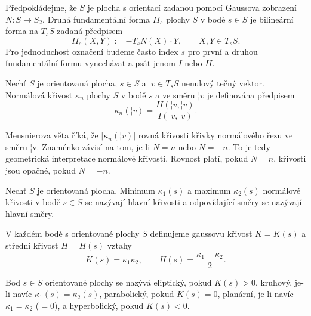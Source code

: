 \documentclass[12pt]{article}                   %
\begin{document}
        \begin{definice}
            Předpokládejme, že $S$ je plocha s orientací zadanou pomocí Gaussova zobrazení $N: S \rightarrow S_2$. Druhá fundamentální forma $II_s$ plochy $S$ v bodě $s \in S$ je bilineární forma na $T_sS$ zadaná předpisem
            $$ II_s(X, Y) := -T_sN(X)·Y, \qquad X, Y \in T_sS. $$
            Pro jednoduchost označení budeme často index $s$ pro první a druhou fundamentální formu vynechávat a psát jenom $I$ nebo $II$.
        \end{definice}

        \begin{definice}
            Nechť $S$ je orientovaná plocha, $s \in S$ a $¦v \in T_sS$ nenulový tečný vektor. Normálová křivost $\kappa_n$ plochy $S$ v bodě $s$ a ve směru $¦v$ je definována předpisem
            $$ \kappa_n(¦v) = \frac{II(¦v, ¦v)}{I(¦v, ¦v)}. $$

            \begin{poznamkain}
                Meusnierova věta říká, že $|\kappa_n(¦v)|$ rovná křivosti křivky normálového řezu ve směru ¦v. Znaménko závisí na tom, je-li $N = n$ nebo $N = -n$. To je tedy geometrická interpretace normálové křivosti. Rovnost platí, pokud $N = n$, křivosti jsou opačné, pokud $N = -n$.
            \end{poznamkain}
        \end{definice}

        \begin{definice}
            Nechť $S$ je orientovaná plocha. Minimum $\kappa_1(s)$ a maximum $\kappa_2(s)$ normálové křivosti v bodě $s \in S$ se nazývají hlavní křivosti a odpovídající směry se nazývají hlavní směry.

            V každém bodě s orientované plochy $S$ definujeme gaussovu křivost $K = K(s)$ a střední křivost $H = H(s)$ vztahy
            $$ K(s) = \kappa_1\kappa_2, \qquad H(s) = \frac{\kappa_1 + \kappa_2}{2}. $$
        \end{definice}

        \begin{definice}
            Bod $s \in S$ orientované plochy se nazývá eliptický, pokud $K(s) > 0$, kruhový, je-li navíc $\kappa_1(s) = \kappa_2(s)$, parabolický, pokud $K(s) = 0$, planární, je-li navíc $\kappa_1 = \kappa_2$ ($= 0$), a hyperbolický, pokud $K(s) < 0$.
        \end{definice}
\end{document}
